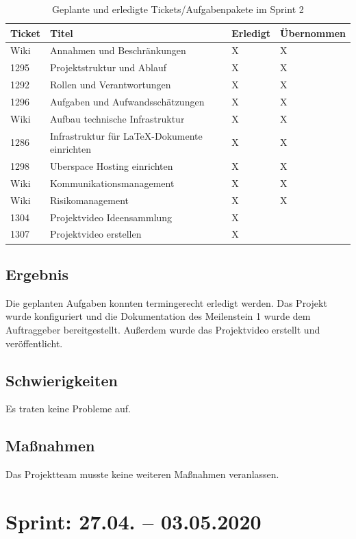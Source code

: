 \documentclass[a4paper,11pt,listof=numbered,glossary=totoc,parskip=half,toc=bib]{scrreprt}
\begin{document}
\begin{table}    
    \begin{tabularx}{\textwidth}{lXll}
			\toprule
			\textbf{Ticket} & \textbf{Titel} & \textbf{Erledigt} & \textbf{Übernommen} \\
			\midrule
Wiki	&	Annahmen und Beschränkungen	&	X	&	X	\\
1295	&	Projektstruktur und Ablauf	&	X	&	X	\\
1292	&	Rollen und Verantwortungen	&	X	&	X	\\
1296	&	Aufgaben und Aufwandsschätzungen	&	X	&	X	\\
Wiki	&	Aufbau technische Infrastruktur	&	X	&	X	\\
1286	&	Infrastruktur für LaTeX-Dokumente einrichten	&	X	&	X	\\
1298	&	Uberspace Hosting einrichten	&	X	&	X	\\
Wiki	&	Kommunikationsmanagement	&	X	&	X	\\
Wiki	&	Risikomanagement	&	X	&	X	\\
1304	&	Projektvideo Ideensammlung	&	X	&		\\
1307	&	Projektvideo erstellen	&	X	&		\\
			\bottomrule
		\end{tabularx}
\caption{Geplante und erledigte Tickets/Aufgabenpakete im Sprint 2}
\label{tab:sprint2}
\end{table}
   
    \section{Ergebnis}
    Die geplanten Aufgaben konnten termingerecht erledigt werden. Das Projekt wurde konfiguriert und die Dokumentation des Meilenstein 1 wurde dem Auftraggeber bereitgestellt. Außerdem wurde das Projektvideo erstellt und veröffentlicht.
    
    \section{Schwierigkeiten}
    Es traten keine Probleme auf. 
    
    \section{Maßnahmen}
    Das Projektteam musste keine weiteren Maßnahmen veranlassen.
	    
    \chapter{Sprint: 27.04. – 03.05.2020}
\end{document}
